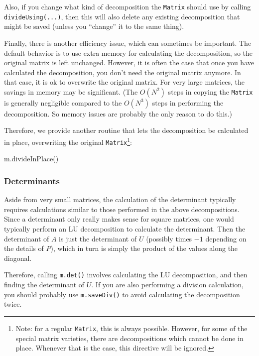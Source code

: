 \documentclass[twoside,letterpaper,11pt]{article}
\renewcommand{\tt}[1]{{\lstinline {#1}}}
\begin{document}
Also, if you change what kind of decomposition the \tt{Matrix} should use by calling
\tt{divideUsing(...)}, then this will also delete any existing decomposition that 
might be saved (unless you ``change'' it to the same thing).

Finally, there is another efficiency issue, which can sometimes be important.  The default
behavior is to use extra memory for calculating the decomposition, so the original
matrix is left unchanged.  However, it is often the case that once you have 
calculated the decomposition, you don't need the original matrix anymore.
In that case, it is ok to overwrite the original matrix.  For very large matrices, 
the savings in memory may be significant.  (The $O(N^2)$ steps in copying 
the \tt{Matrix} is generally negligible compared to the $O(N^3)$ steps in performing
the decomposition.  So memory issues are probably the only reason to do this.)

Therefore, we provide another routine that lets the decomposition be 
calculated in place, overwriting the original \tt{Matrix}\footnote{
Note: for a regular \tt{Matrix}, this is always possible.  However, for some of the 
special matrix varieties, there are decompositions which cannot be done in place.
Whenever that is the case, this directive will be ignored.}:
\begin{tmvcode}
m.divideInPlace()
\end{tmvcode}

\subsubsection{Determinants}
\label{Matrix_Division_Determinants}

Aside from very small matrices, the calculation of the determinant typically 
requires calculations similar to those performed in
the above decompositions.  Since a determinant only really makes sense
for square matrices, one would typically perform an LU decomposition to calculate
the determinant.  Then the determinant of $A$ is just the determinant of $U$
(possibly times $-1$ depending on the details of $P$), which in turn is simply the 
product of the values along the diagonal.

Therefore, calling \tt{m.det()} involves calculating the LU decomposition, and then
finding the determinant of $U$.  
If you are also performing a division calculation, you should probably use
\tt{m.saveDiv()} to avoid calculating the decomposition twice.
\end{document}
